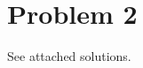 \documentclass[12pt]{article}
\begin{document}
\newpage

\section*{Problem 2}

See attached solutions.


\end{document}
